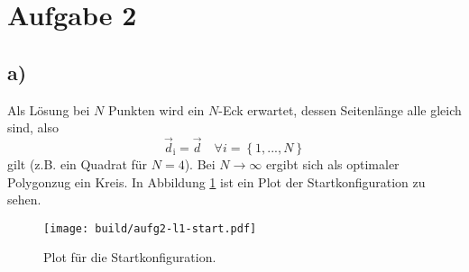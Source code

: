 \section*{Aufgabe 2}

\subsection*{a)}
Als Lösung bei $N$ Punkten wird ein $N$-Eck erwartet, dessen Seitenlänge alle gleich sind,
also
\begin{equation*}
  \vec{d}_\text{i} = \vec{d} \quad \forall i=\left\{1, ..., N\right\}
\end{equation*}
gilt (z.B. ein Quadrat für $N = 4$).
Bei $N \rightarrow \infty$ ergibt sich als optimaler Polygonzug ein Kreis.
In Abbildung \ref{fig:1} ist ein Plot der Startkonfiguration zu sehen.

\begin{figure}
  \centering
  \texttt{[image: build/aufg2-l1-start.pdf]}
  \caption{Plot für die Startkonfiguration.}
  \label{fig:1}
\end{figure}
